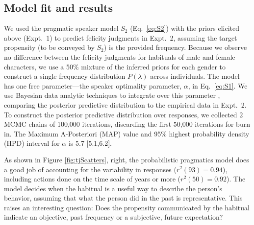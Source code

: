 \documentclass[10pt,letterpaper]{article}
\begin{document}

\subsection{Model fit and results}

We used the pragmatic speaker model $S_2$ (Eq.~\ref{eq:S2}) with the priors elicited above (Expt.~1) to predict felicity judgments in Expt.~2, assuming the target propensity (to be conveyed by $S_2$) is the provided frequency.
Because we observe no difference between the felicity judgments for habituals of male and female characters, we use a 50\% mixture of the inferred priors for each gender to construct a single frequency distribution $P(\lambda)$ across individuals.
The model has one free parameter---the speaker optimality parameter, $\alpha$, in Eq.~\ref{eq:S1}. 
We use Bayesian data analytic techniques to integrate over this parameter \cite{LW2014}, comparing the posterior predictive distribution to the empirical data in Expt.~2.
To construct the posterior predictive distribution over responses, we collected 2 MCMC chains of 100,000 iterations, discarding the first 50,000 iterations for burn in.
The Maximum A-Posteriori (MAP) value and 95\% highest probability density (HPD) interval for $\alpha$ is 5.7 [5.1,6.2].

As shown in Figure \ref{fig:tjScatters}, right, the probabilistic pragmatics model does a good job of accounting for the variability in responses ($r^2(93) = 0.94$), including actions done on the time scale of years or more  ($r^2(50) = 0.92$).
The model decides when the habitual is a useful way to describe the person's behavior, assuming that what the person did in the past is representative. 
This raises an interesting question: Does the propensity communicated by the habitual indicate an objective, past frequency or a subjective, future expectation?
\end{document}
